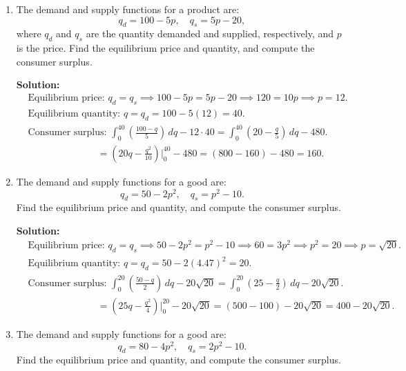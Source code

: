 \documentclass{article}
\begin{document}
\begin{enumerate}[leftmargin=0.5cm, label=\arabic*., rightmargin=0.2cm]

    \item The demand and supply functions for a product are:
    $$
    q_d = 100 - 5p, \quad q_s = 5p - 20,
    $$
    where $q_d$ and $q_s$ are the quantity demanded and supplied, respectively, and $p$ is the price. Find the equilibrium price and quantity, and compute the consumer surplus.

    \textbf{Solution:}
    \begin{align*}
        &\text{Equilibrium price: } q_d = q_s \implies 100 - 5p = 5p - 20
        \implies 120 = 10p \implies p = 12. \\
        & \text{Equilibrium quantity: } q = q_d = 100 - 5(12) = 40. \\
        & \text{Consumer surplus: } \int_0^{40} \left(\frac{100 - q}{5}\right) \, dq - 12 \cdot 40 
        = \int_0^{40} \left(20 - \frac{q}{5}\right) \, dq - 480. \\
        &\hspace{3cm} = \left(20q - \frac{q^2}{10}\right)\Big|_0^{40} - 480 = (800 - 160) - 480 = 160.
    \end{align*}

    \item The demand and supply functions for a good are:
    $$
    q_d = 50 - 2p^2, \quad q_s = p^2 - 10.
    $$
    Find the equilibrium price and quantity, and compute the consumer surplus.

    \textbf{Solution:}
    \begin{align*}
        &\text{Equilibrium price: } q_d = q_s \implies 50 - 2p^2 = p^2 - 10
        \implies 60 = 3p^2 \implies p^2 = 20 \implies p = \sqrt{20}. \\
        & \text{Equilibrium quantity: } q = q_d = 50 - 2(4.47)^2 = 20. \\
        & \text{Consumer surplus: } \int_0^{20} \left(\frac{50 - q}{2}\right) \, dq - 20\sqrt{20}
        = \int_0^{20} \left(25 - \frac{q}{2}\right) \, dq - 20\sqrt{20}. \\
        &\hspace{3cm} = \left(25q - \frac{q^2}{4}\right)\Big|_0^{20} - 20\sqrt{20} = (500 - 100) - 20\sqrt{20} = 400 - 20\sqrt{20}.
    \end{align*}

    \item The demand and supply functions for a good are:
    $$
    q_d = 80 - 4p^2, \quad q_s = 2p^2 - 10.
    $$
    Find the equilibrium price and quantity, and compute the consumer surplus.


\end{enumerate}
\end{document}
